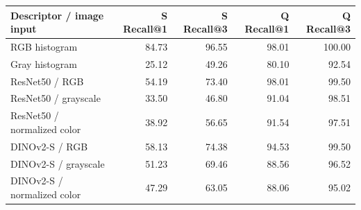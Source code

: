 \begin{tabular}{lrrrr}
\toprule
Descriptor / image input & S Recall@1 & S Recall@3 & Q Recall@1 & Q Recall@3 \\
\midrule
RGB histogram & 84.73 & 96.55 & 98.01 & 100.00 \\
Gray histogram & 25.12 & 49.26 & 80.10 & 92.54 \\
ResNet50 / RGB & 54.19 & 73.40 & 98.01 & 99.50 \\
ResNet50 / grayscale & 33.50 & 46.80 & 91.04 & 98.51 \\
ResNet50 / normalized color & 38.92 & 56.65 & 91.54 & 97.51 \\
DINOv2-S / RGB & 58.13 & 74.38 & 94.53 & 99.50 \\
DINOv2-S / grayscale & 51.23 & 69.46 & 88.56 & 96.52 \\
DINOv2-S / normalized color & 47.29 & 63.05 & 88.06 & 95.02 \\
\bottomrule
\end{tabular}
